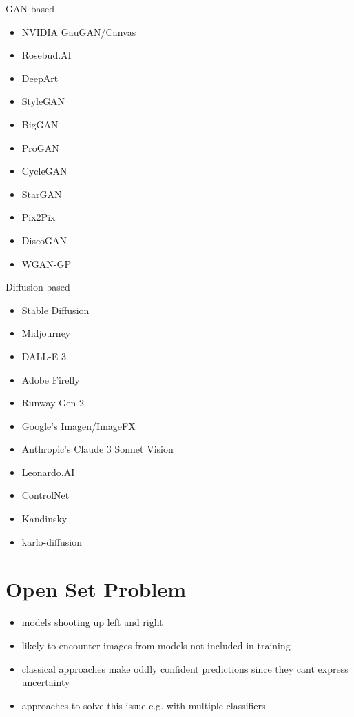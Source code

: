 \documentclass[fleqn,compress,utf8,aspectratio=169,t,handout]{beamer}
\begin{document}
\begin{frame}
    \begin{minipage}{0.45\textwidth}
      GAN based
      \begin{itemize}
        \item NVIDIA GauGAN/Canvas
        \item Rosebud.AI
        \item DeepArt
        \item StyleGAN
        \item BigGAN
        \item ProGAN
        \item CycleGAN
        \item StarGAN
        \item Pix2Pix
        \item DiscoGAN
        \item WGAN-GP
      \end{itemize}
    \end{minipage}
		\begin{minipage}{0.45\textwidth}
      Diffusion based
      \begin{itemize}
        \item Stable Diffusion
        \item Midjourney
        \item DALL-E 3
        \item Adobe Firefly
        \item Runway Gen-2
        \item Google's Imagen/ImageFX
        \item Anthropic's Claude 3 Sonnet Vision
        \item Leonardo.AI
        \item ControlNet
        \item Kandinsky
        \item karlo-diffusion
      \end{itemize}
    \end{minipage}
\end{frame}

\section{Open Set Problem}
\begin{frame}
\begin{itemize}
    \item models shooting up left and right
    \item likely to encounter images from models not included in training
    \item classical approaches make oddly confident predictions since they cant express uncertainty
    \item approaches to solve this issue e.g. with multiple classifiers
\end{itemize}
\end{frame}
\end{document}
